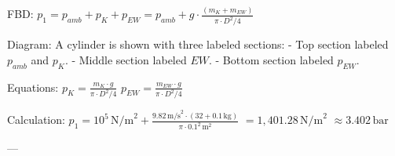 FBD:  
\( p_1 = p_{amb} + p_K + p_{EW} = p_{amb} + g \cdot \frac{(m_K + m_{EW})}{\pi \cdot D^2 / 4} \)  

Diagram:  
A cylinder is shown with three labeled sections:  
- Top section labeled \( p_{amb} \) and \( p_K \).  
- Middle section labeled \( EW \).  
- Bottom section labeled \( p_{EW} \).  

Equations:  
\( p_K = \frac{m_K \cdot g}{\pi \cdot D^2 / 4} \)  
\( p_{EW} = \frac{m_{EW} \cdot g}{\pi \cdot D^2 / 4} \)  

Calculation:  
\( p_1 = 10^5 \, \text{N/m}^2 + \frac{9.82 \, \text{m/s}^2 \cdot (32 + 0.1 \, \text{kg})}{\pi \cdot 0.1^2 \, \text{m}^2} \)  
\( = 1,401.28 \, \text{N/m}^2 \)  
\( \approx 3.402 \, \text{bar} \)  

---